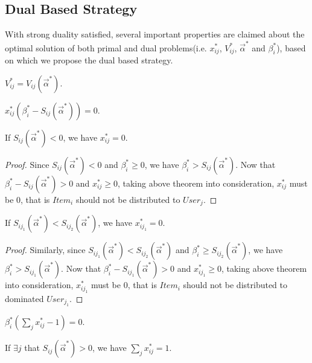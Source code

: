 \documentclass[sigconf]{acmart}
\newcommand{\sx}{x_{ij}}
\newcommand{\sV}{V_{ij}}
\newcommand{\sbeta}{\beta_i}
\newcommand{\sS}{S_{ij}}
\newcommand{\valpha}{\vec{\alpha}}
\begin{document}
\subsection{Dual Based Strategy}

With strong duality satisfied, several important properties
    are claimed about the optimal solution of both primal and dual problems(i.e. $\sx^*$, $\sV^*$, $\valpha^*$ and $\sbeta^*$),
    based on which we propose the dual based strategy.

\begin{theorem}
$\sV^* = \sV(\valpha^*)$.
\end{theorem}

\begin{theorem}
$\sx^*(\sbeta^* - \sS(\valpha^*)) = 0$.
\end{theorem}

\begin{corollary}
If $\sS(\valpha^*) < 0$, we have $\sx^* = 0$.
\end{corollary}

\begin{proof}
Since $\sS(\valpha^*) < 0$ and $\sbeta^* \ge 0$, we have $\sbeta^* > \sS(\valpha^*)$.
Now that $\sbeta^* - \sS(\valpha^*) > 0$ and $\sx^* \ge 0$,
    taking above theorem into consideration, $\sx^*$ must be 0,
    that is $Item_i$ should not be distributed to $User_j$.
\end{proof}

\begin{corollary}
If $S_{ij_1}(\valpha^*) < S_{ij_2}(\valpha^*)$, we have $x_{ij_1}^* = 0$.
\end{corollary}

\begin{proof}
Similarly, since $S_{ij_1}(\valpha^*) < S_{ij_2}(\valpha^*)$ and $\sbeta^* \ge S_{ij_2}(\valpha^*)$,
    we have $\sbeta^* > S_{ij_1}(\valpha^*)$.
Now that $\sbeta^* - S_{ij_1}(\valpha^*) > 0$ and $x_{ij_1}^* \ge 0$, 
    taking above theorem into consideration, $x_{ij_1}^*$ must be 0,
    that is $Item_i$ should not be distributed to dominated $User_{j_1}$.
\end{proof}

\begin{theorem}
$\sbeta^*(\sum\limits_j \sx^* - 1) = 0$.
\end{theorem}

\begin{corollary}
If $\exists j$ that $\sS(\valpha^*) > 0$, we have $\sum\limits_j \sx^* = 1$.
\end{corollary}
\end{document}
